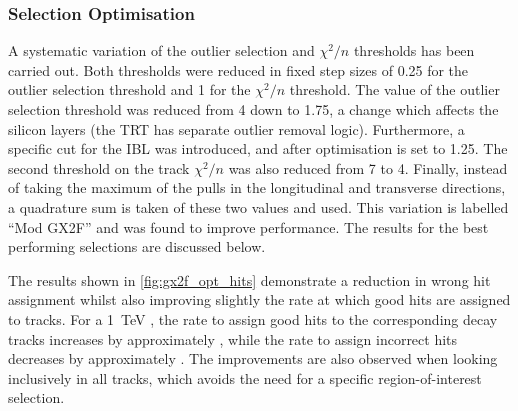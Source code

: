 \subsubsection{Selection Optimisation}

A systematic variation of the outlier selection and $\chi^2/n$ thresholds has been carried out.
Both thresholds were reduced in fixed step sizes of 0.25 for the outlier selection threshold and 1 for the $\chi^2/n$ threshold.
The value of the outlier selection threshold was reduced from 4 down to 1.75, a change which affects the silicon layers (the TRT has separate outlier removal logic).
Furthermore, a specific cut for the IBL was introduced, and after optimisation is set to 1.25.
The second threshold on the track $\chi^2/n$ was also reduced from 7 to 4.
Finally, instead of taking the maximum of the pulls in the longitudinal and transverse directions, a quadrature sum is taken of these two values and used.
This variation is labelled ``Mod GX2F'' and was found to improve performance.
The results for the best performing selections are discussed below.

The results shown in \cref{fig:gx2f_opt_hits} demonstrate a reduction in wrong hit assignment whilst also improving slightly the rate at which good hits are assigned to tracks.
For a \SI{1}{\TeV} \bhadron, the rate to assign good hits to the corresponding decay tracks increases by approximately , while the rate to assign incorrect hits decreases by approximately .
The improvements are also observed when looking inclusively in all tracks, which avoids the need for a specific \bjet region-of-interest selection.

